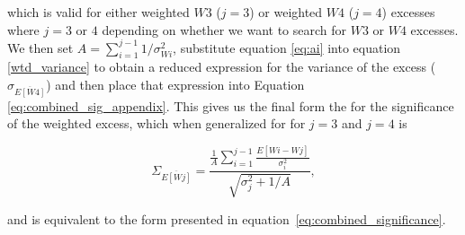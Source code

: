 \noindent  which is valid for either weighted $W3$ ($j=3$) or weighted $W4$ ($j=4$) excesses where $j=3 \mbox{ or } 4$ depending on whether we want to search for $W3$ or $W4$ excesses. We then set $A=\sum_{i=1}^{j-1}1/\sigma_{Wi}^2$, substitute equation \ref{eq:ai} into equation \ref{wtd_variance} to obtain a reduced expression for the variance of the excess ($\sigma_{\overline{E[W4]}}$) and then place that expression into Equation \ref{eq:combined_sig_appendix}. This gives us the final form the for the significance of the weighted excess, which when generalized for for $j=3$ and $j=4$ is

\begin{equation}\label{eq:wtd_significance_appendix2}
\Sigma_{\overline{E[Wj]}} = \frac{\frac{1}{A}\sum\limits_{i=1}^{j-1}\frac{E[Wi-Wj]}{\sigma_i^2}}{\sqrt{\sigma_j^2 + 1/A}},  
\end{equation}

\noindent and is equivalent to the form presented in equation~\ref{eq:combined_significance}.